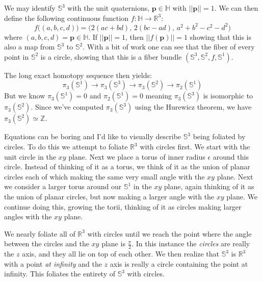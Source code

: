 \documentclass{beamer}
\begin{document}
    \begin{frame}
        We may identify $\mathbb{S}^{3}$ with the unit quaternions,
        $\mathbf{p}\in\mathbb{H}$ with $||\mathbf{p}||=1$. We can then define
        the following continuous function
        $f:\mathbb{H}\rightarrow\mathbb{R}^{3}$:
        \begin{equation}
            f\big((a,b,c,d)\big)
                =\big(2(ac+bd),\,2(bc-ad),\,a^{2}+b^{2}-c^{2}-d^{2}\big)
        \end{equation}
        where $(a,b,c,d)=\mathbf{p}\in\mathbb{H}$. If $||\mathbf{p}||=1$, then
        $||f(\mathbf{p})||=1$ showing that this is also a map from
        $\mathbb{S}^{3}$ to $\mathbb{S}^{2}$. With a bit of work one can see
        that the fiber of every point in $\mathbb{S}^{2}$ is a circle, showing
        that this is a fiber bundle
        $(\mathbb{S}^{3},\mathbb{S}^{2},f,\mathbb{S}^{1})$.
    \end{frame}
    \begin{frame}
        The long exact homotopy sequence then yields:
        \begin{equation}
            \pi_{3}(\mathbb{S}^{1})\rightarrow\pi_{3}(\mathbb{S}^{3})
            \rightarrow\pi_{3}(\mathbb{S}^{2})\rightarrow\pi_{2}(\mathbb{S}^{1})
        \end{equation}
        But we know $\pi_{3}(\mathbb{S}^{1})=0$ and
        $\pi_{2}(\mathbb{S}^{1})=0$ meaning
        $\pi_{3}(\mathbb{S}^{3})$ is isomorphic to
        $\pi_{3}(\mathbb{S}^{2})$. Since we've computed
        $\pi_{3}(\mathbb{S}^{3})$ using the Hurewicz theorem, we have
        $\pi_{3}(\mathbb{S}^{2})\simeq\mathbb{Z}$.
    \end{frame}
    \begin{frame}
        Equations can be boring and I'd like to visually describe
        $\mathbb{S}^{3}$ being foliated by circles. To do this we attempt to
        foliate $\mathbb{R}^{3}$ with circles first. We start with the unit
        circle in the $xy$ plane. Next we place a torus of inner radius
        $\epsilon$ around this circle. Instead of thinking of it as a torus,
        we think of it as the union of planar circles each of which making the
        same very small angle with the $xy$ plane. Next we consider a larger
        torus around our $\mathbb{S}^{1}$ in the $xy$ plane, again thinking of
        it as the union of planar circles, but now making a larger angle with
        the $xy$ plane. We continue doing this, growing the torii, thinking of
        it as circles making larger angles with the $xy$ plane.
        \par\hfill\par
        We nearly foliate all of $\mathbb{R}^{3}$ with circles until we reach
        the point where the angle between the circles and the $xy$ plane is
        $\frac{\pi}{2}$. In this instance the \textit{circles} are really the
        $z$ axis, and they all lie on top of each other. We then realize that
        $\mathbb{S}^{3}$ is $\mathbb{R}^{3}$ with a point
        \textit{at infinity} and the $z$ axis is really a circle containing
        the point at infinity. This foliates the entirety of $\mathbb{S}^{3}$
        with circles.
    \end{frame}
\end{document}
